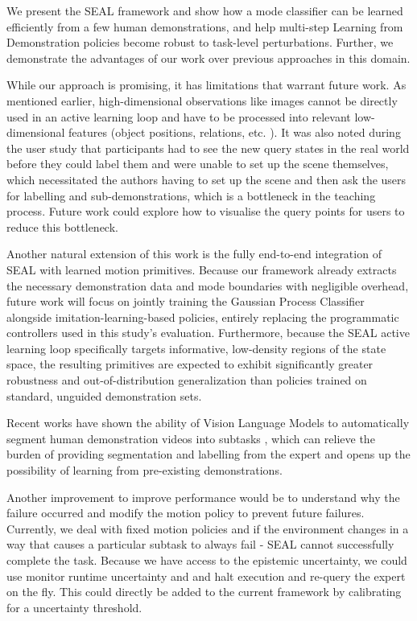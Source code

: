 \documentclass[journal]{IEEEtran}
\begin{document}
We present the SEAL framework and show how a mode classifier can be learned efficiently from a few human demonstrations, and help multi-step Learning from Demonstration policies become robust to task-level perturbations. Further, we demonstrate the advantages of our work over previous approaches in this domain.

While our approach is promising, it has limitations that warrant future work. As mentioned earlier, high-dimensional observations like images cannot be directly used in an active learning loop and have to be processed into relevant low-dimensional features (object positions, relations, etc. ). It was also noted during the user study that participants had to see the new query states in the real world before they could label them and were unable to set up the scene themselves, which necessitated the authors having to set up the scene and then ask the users for labelling and sub-demonstrations, which is a bottleneck in the teaching process. Future work could explore how to visualise the query points for users to reduce this bottleneck.

Another natural extension of this work is the fully end-to-end integration of SEAL with learned motion primitives. Because our framework already extracts the necessary demonstration data and mode boundaries with negligible overhead, future work will focus on jointly training the Gaussian Process Classifier alongside imitation-learning-based policies, entirely replacing the programmatic controllers used in this study's evaluation. Furthermore, because the SEAL active learning loop specifically targets informative, low-density regions of the state space, the resulting primitives are expected to exhibit significantly greater robustness and out-of-distribution generalization than policies trained on standard, unguided demonstration sets.

Recent works have shown the ability of Vision Language Models to automatically segment human demonstration videos into subtasks \cite{wang2024vlmseerobotdo}, which can relieve the burden of providing segmentation and labelling from the expert and opens up the possibility of learning from pre-existing demonstrations.

Another improvement to improve performance would be to understand why the failure occurred and modify the motion policy to prevent future failures. Currently, we deal with fixed motion policies and if the environment changes in a way that causes a particular subtask to always fail - SEAL cannot successfully complete the task. Because we have access to the epistemic uncertainty, we could use monitor runtime uncertainty and and halt execution and re-query the expert on the fly. This could directly be added to the current framework by calibrating for a uncertainty threshold.
\end{document}
